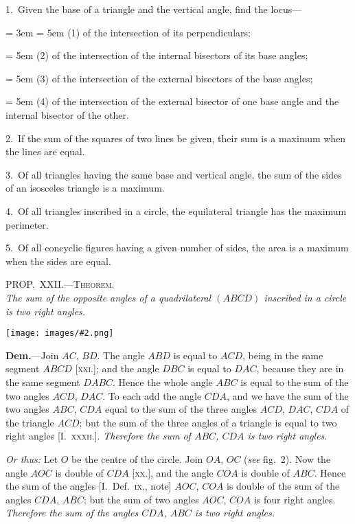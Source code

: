 \documentclass[oneside]{book}
\newcommand\myprop[2]{
\bigskip\Needspace*{4\baselineskip}\begin{center}\textsc{#1}\\\medskip\emph{#2}\par\end{center}
}
\newcommand\imgcent[2]{
\begin{center}
\texttt{[image: images/\#2.png]}
\end{center}
}
\begin{document}
\begin{footnotesize}
1.~Given the base of a triangle and the vertical angle, find the
locus---

{\parindent= 3em
\hangindent= 5em
(1) of the intersection of its perpendiculars;

\hangindent= 5em
(2) of the intersection of the internal bisectors of its base
angles;

\hangindent= 5em
(3) of the intersection of the external bisectors of the base
angles;

\hangindent= 5em
(4) of the intersection of the external bisector of one base
angle and the internal bisector of the other.
}

2.~If the sum of the squares of two lines be given, their sum
is a maximum when the lines are equal.

3.~Of all triangles having the same base and vertical angle, the
sum of the sides of an isosceles triangle is a maximum.

4.~Of all triangles inscribed in a circle, the equilateral triangle
has the maximum perimeter.

5.~Of all concyclic figures having a given number of sides, the
area is a maximum when the sides are equal.
\par\end{footnotesize}

\myprop{PROP\@.~XXII\@.---Theorem.}{The sum of the opposite angles of a quadrilateral $(ABCD)$
inscribed in a circle is two right angles.}

\imgcent{225}{f129}

\textbf{Dem.}---Join $AC$, $BD$. The angle $ABD$ is equal to
$ACD$, being in the same segment $ABCD$ [\textsc{xxi.}]; and
the angle $DBC$ is equal to $DAC$, because they are in
the same segment $DABC$. Hence the whole angle $ABC$
is equal to the sum of the two angles $ACD$, $DAC$. To
each add the angle $CDA$, and we have the sum of the
two angles $ABC$, $CDA$ equal to the sum of the three
angles $ACD$, $DAC$, $CDA$ of the triangle $ACD$; but the
sum of the three angles of a triangle is equal to two
right angles [I.~\textsc{xxxii.}]. \emph{Therefore the sum of $ABC$,
$CDA$ is two right angles.}

\emph{Or thus:} Let $O$ be the centre of the circle. Join
$OA$, $OC$ (\emph{see} fig.~2). Now the angle $AOC$ is double of
$CDA$ [\textsc{xx.}], and the angle $COA$ is double of $ABC$.
Hence the sum of the angles [I.~Def.~\textsc{ix.}, note]
$AOC$, $COA$ is double of the sum of the angles $CDA$,
$ABC$; but the sum of two angles $AOC$, $COA$ is four
right angles. \emph{Therefore the sum of the angles $CDA$,
$ABC$ is two right angles.}
\end{document}
